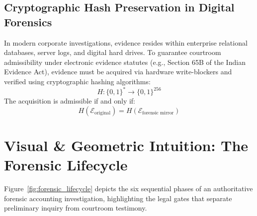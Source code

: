 \subsection{Cryptographic Hash Preservation in Digital Forensics}
In modern corporate investigations, evidence resides within enterprise relational databases, server logs, and digital hard drives. To guarantee courtroom admissibility under electronic evidence statutes (e.g., Section 65B of the Indian Evidence Act), evidence must be acquired via hardware write-blockers and verified using cryptographic hashing algorithms:
\begin{equation}
H: \{0, 1\}^* \to \{0, 1\}^{256}
\end{equation}
The acquisition is admissible if and only if:
\begin{equation}
H(\mathcal{E}_{\text{original}}) = H(\mathcal{E}_{\text{forensic mirror}})
\end{equation}

\section{Visual \& Geometric Intuition: The Forensic Lifecycle}

Figure~\ref{fig:forensic_lifecycle} depicts the six sequential phases of an authoritative forensic accounting investigation, highlighting the legal gates that separate preliminary inquiry from courtroom testimony.


